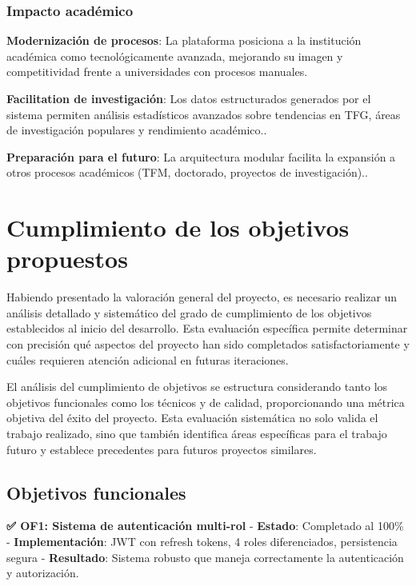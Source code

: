 \documentclass[12pt,a4paper,oneside]{report}
\begin{document}
\subsubsection{Impacto académico}\label{impacto-acaduxe9mico}

\textbf{Modernización de procesos}: La plataforma posiciona a la
institución académica como tecnológicamente avanzada, mejorando su
imagen y competitividad frente a universidades con procesos manuales.

\textbf{Facilitation de investigación}: Los datos estructurados
generados por el sistema permiten análisis estadísticos avanzados sobre
tendencias en TFG, áreas de investigación populares y rendimiento
académico..

\textbf{Preparación para el futuro}: La arquitectura modular facilita la
expansión a otros procesos académicos (TFM, doctorado, proyectos de
investigación)..

\section{Cumplimiento de los objetivos
propuestos}\label{cumplimiento-de-los-objetivos-propuestos}

Habiendo presentado la valoración general del proyecto, es necesario
realizar un análisis detallado y sistemático del grado de cumplimiento
de los objetivos establecidos al inicio del desarrollo. Esta evaluación
específica permite determinar con precisión qué aspectos del proyecto
han sido completados satisfactoriamente y cuáles requieren atención
adicional en futuras iteraciones.

El análisis del cumplimiento de objetivos se estructura considerando
tanto los objetivos funcionales como los técnicos y de calidad,
proporcionando una métrica objetiva del éxito del proyecto. Esta
evaluación sistemática no solo valida el trabajo realizado, sino que
también identifica áreas específicas para el trabajo futuro y establece
precedentes para futuros proyectos similares.

\subsection{Objetivos funcionales}\label{objetivos-funcionales}

\textbf{✅ OF1: Sistema de autenticación multi-rol} - \textbf{Estado}:
Completado al 100\% - \textbf{Implementación}: JWT con refresh tokens, 4
roles diferenciados, persistencia segura - \textbf{Resultado}: Sistema
robusto que maneja correctamente la autenticación y autorización.
\end{document}
